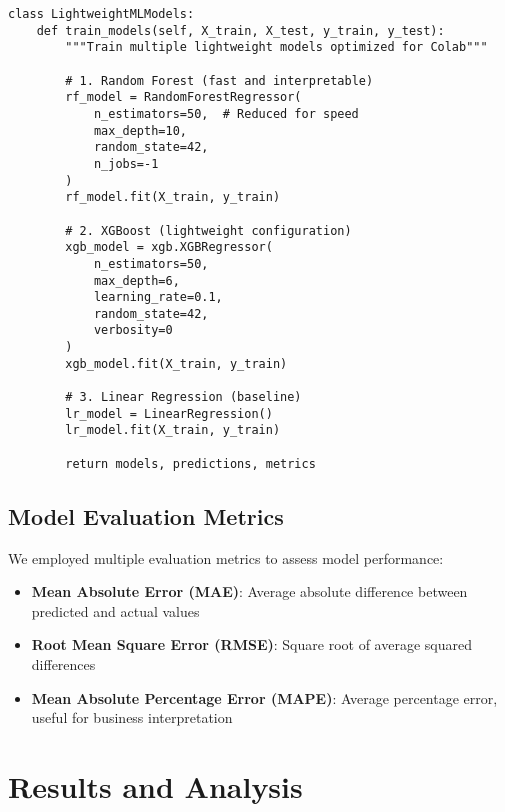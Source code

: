\documentclass[12pt,a4paper]{article}
\begin{document}
\begin{lstlisting}[caption={Lightweight ML Models Implementation}]
class LightweightMLModels:
    def train_models(self, X_train, X_test, y_train, y_test):
        """Train multiple lightweight models optimized for Colab"""
        
        # 1. Random Forest (fast and interpretable)
        rf_model = RandomForestRegressor(
            n_estimators=50,  # Reduced for speed
            max_depth=10,
            random_state=42,
            n_jobs=-1
        )
        rf_model.fit(X_train, y_train)
        
        # 2. XGBoost (lightweight configuration)
        xgb_model = xgb.XGBRegressor(
            n_estimators=50,
            max_depth=6,
            learning_rate=0.1,
            random_state=42,
            verbosity=0
        )
        xgb_model.fit(X_train, y_train)
        
        # 3. Linear Regression (baseline)
        lr_model = LinearRegression()
        lr_model.fit(X_train, y_train)
        
        return models, predictions, metrics
\end{lstlisting}

\subsection{Model Evaluation Metrics}
We employed multiple evaluation metrics to assess model performance:

\begin{itemize}
    \item \textbf{Mean Absolute Error (MAE)}: Average absolute difference between predicted and actual values
    \item \textbf{Root Mean Square Error (RMSE)}: Square root of average squared differences
    \item \textbf{Mean Absolute Percentage Error (MAPE)}: Average percentage error, useful for business interpretation
\end{itemize}

\section{Results and Analysis}
\end{document}
